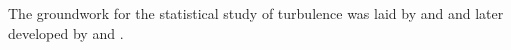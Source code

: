 

The groundwork for the statistical study of turbulence was laid by \citet{taylor1935i,taylor1935ii} and \citet{karman1937statistical} and later developed by \citet{kolm1,kolm2} and \citet{heisenberg1951stability}. 



